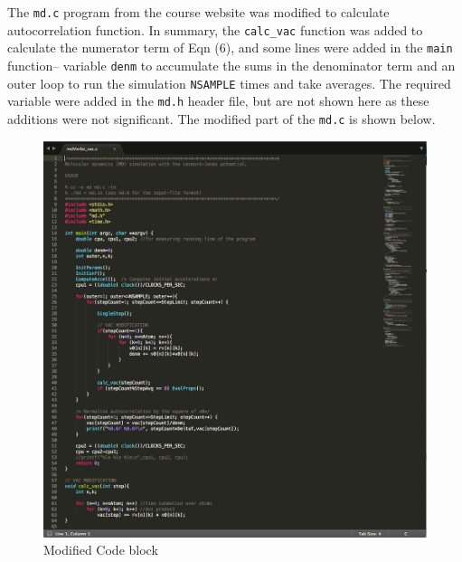 \documentclass[11pt, oneside]{article}   	%
\begin{document}
The \texttt{md.c} program from the course website was modified to calculate autocorrelation function. In summary, the \texttt{calc\_vac} function was added to calculate the numerator term of Eqn (6), and some lines were added in the \texttt{main} 
function-- variable \texttt{denm} to accumulate the sums in the denominator term and an outer loop to run the simulation \texttt{NSAMPLE} times and take averages. The required variable were added in the \texttt{md.h} header file, but are not shown here as these additions were not significant. The modified part of the \texttt{md.c} is shown below.
	\begin{figure}[!htbp]
	\centering
	\includegraphics[scale=0.35]{mdVerlet_vac_pic.jpg}
	\caption{Modified Code block}
	\end{figure}
\end{document}
